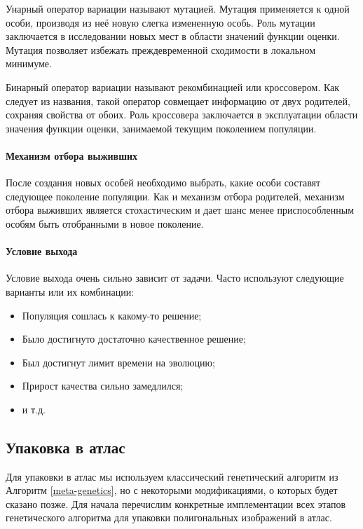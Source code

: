 \documentclass{fefu_thesis/cls/fefu}
\newcommand*\talgref[1]{Алгоритм \ref{#1}}
\begin{document}
    Унарный оператор вариации называют мутацией. Мутация применяется к одной особи, производя из неё новую слегка измененную особь. Роль мутации заключается в исследовании новых мест в области значений функции оценки. Мутация позволяет избежать преждевременной сходимости в локальном минимуме.

    Бинарный оператор вариации называют рекомбинацией или кроссовером. Как следует из названия, такой оператор совмещает информацию от двух родителей, сохраняя свойства от обоих. Роль кроссовера заключается в эксплуатации области значения функции оценки, занимаемой текущим поколением популяции.

    \paragraph{Механизм отбора выживших}

    После создания новых особей необходимо выбрать, какие особи составят следующее поколение популяции. Как и механизм отбора родителей, механизм отбора выживших является стохастическим и дает шанс менее приспособленным особям быть отобранными в новое поколение.

    \paragraph{Условие выхода}

    Условие выхода очень сильно зависит от задачи. Часто используют следующие варианты или их комбинации:

    \begin{itemize}
        \item Популяция сошлась к какому-то решение;
        \item Было достигнуто достаточно качественное решение;
        \item Был достигнут лимит времени на эволюцию;
        \item Прирост качества сильно замедлился;
        \item и т.д.
    \end{itemize}

    \subsection{Упаковка в атлас}

    Для упаковки в атлас мы используем классический генетический алгоритм из \talgref{meta-genetics}, но с некоторыми модификациями, о которых будет сказано позже. Для начала перечислим конкретные имплементации всех этапов генетического алгоритма для упаковки полигональных изображений в атлас.
\end{document}
